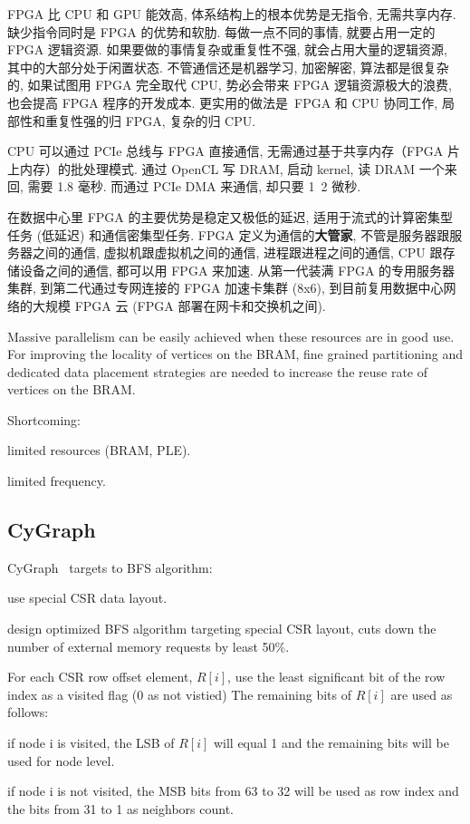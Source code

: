 \documentclass[UTF8,12pt,a4paper]{article}
\begin{document}
FPGA 比 CPU 和 GPU 能效高, 体系结构上的根本优势是无指令, 无需共享内存.
缺少指令同时是 FPGA 的优势和软肋. 每做一点不同的事情, 就要占用一定的 FPGA 逻辑资源.
如果要做的事情复杂或重复性不强, 就会占用大量的逻辑资源, 其中的大部分处于闲置状态.
不管通信还是机器学习, 加密解密, 算法都是很复杂的,
如果试图用 FPGA 完全取代 CPU, 势必会带来 FPGA 逻辑资源极大的浪费, 也会提高 FPGA 程序的开发成本.
更实用的做法是 FPGA 和 CPU 协同工作, 局部性和重复性强的归 FPGA, 复杂的归 CPU.

CPU 可以通过 PCIe 总线与 FPGA 直接通信, 无需通过基于共享内存（FPGA 片上内存）的批处理模式.
通过 OpenCL 写 DRAM, 启动 kernel, 读 DRAM 一个来回, 需要 1.8 毫秒.
而通过 PCIe DMA 来通信, 却只要 1~2 微秒.

在数据中心里 FPGA 的主要优势是稳定又极低的延迟, 适用于流式的计算密集型任务 (低延迟) 和通信密集型任务.
FPGA 定义为通信的\textbf{大管家}, 不管是服务器跟服务器之间的通信, 虚拟机跟虚拟机之间的通信,
进程跟进程之间的通信, CPU 跟存储设备之间的通信, 都可以用 FPGA 来加速.
从第一代装满 FPGA 的专用服务器集群, 到第二代通过专网连接的 FPGA 加速卡集群 (8x6),
到目前复用数据中心网络的大规模 FPGA 云 (FPGA 部署在网卡和交换机之间).

Massive parallelism can be easily achieved when these resources are in good use.
For improving the locality of vertices on the BRAM,
fine grained partitioning and dedicated data placement strategies
are needed to increase the reuse rate of vertices on the BRAM.

Shortcoming:
\begin{compactitem}
  \item limited resources (BRAM, PLE).
  \item limited frequency.
\end{compactitem}

\subsection{CyGraph}
CyGraph~\cite{DBLP:conf/ipps/AttiaJTJZ14}
targets to BFS algorithm:
\begin{compactitem}
  \item use special CSR data layout.
  \item design optimized BFS algorithm targeting special CSR layout,
  cuts down the number of external memory requests by least 50\%.
\end{compactitem}

For each CSR row offset element, $R[i]$,
use the least significant bit of the row index as a visited flag
(0 as not vistied)
The remaining bits of $R[i]$ are used as follows:
\begin{compactitem}
  \item if node i is visited,
  the LSB of $R[i]$ will equal 1
  and the remaining bits will be used for node level.
  \item if node i is not visited,
  the MSB bits from 63 to 32 will be used as row index
  and the bits from 31 to 1 as neighbors count.
\end{compactitem}
\end{document}
